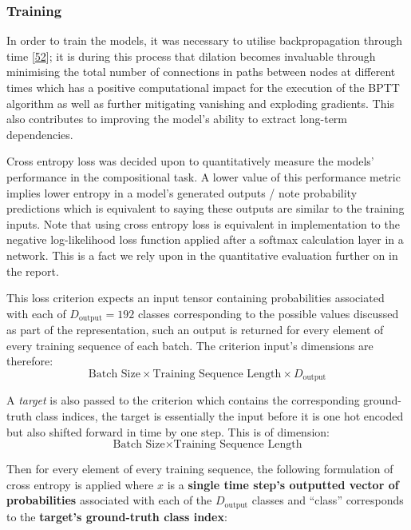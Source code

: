 \documentclass[12pt,]{article}
\begin{document}
\hypertarget{training}{%
\subsubsection{Training}\label{training}}

In order to train the models, it was necessary to utilise
backpropagation through time
{[}\protect\hyperlink{ref-werbos1990backpropagation}{52}{]}; it is
during this process that dilation becomes invaluable through minimising
the total number of connections in paths between nodes at different
times which has a positive computational impact for the execution of the
BPTT algorithm as well as further mitigating vanishing and exploding
gradients. This also contributes to improving the model's ability to
extract long-term dependencies.

Cross entropy loss was decided upon to quantitatively measure the
models' performance in the compositional task. A lower value of this
performance metric implies lower entropy in a model's generated outputs
/ note probability predictions which is equivalent to saying these
outputs are similar to the training inputs. Note that using cross
entropy loss is equivalent in implementation to the negative
log-likelihood loss function applied after a softmax calculation layer
in a network. This is a fact we rely upon in the quantitative evaluation
further on in the report.

This loss criterion expects an input tensor containing probabilities
associated with each of \(D_{\text{output}} = 192\) classes
corresponding to the possible values discussed as part of the
representation, such an output is returned for every element of every
training sequence of each batch. The criterion input's dimensions are
therefore:
\[\text{Batch Size} \times \text{Training Sequence Length} \times D_{\text{output}}\]

A \emph{target} is also passed to the criterion which contains the
corresponding ground-truth class indices, the target is essentially the
input before it is one hot encoded but also shifted forward in time by
one step. This is of dimension:
\[\text{Batch Size} \times \text{Training Sequence Length}\]

Then for every element of every training sequence, the following
formulation of cross entropy is applied where \(x\) is a \textbf{single
time step's outputted vector of probabilities} associated with each of
the \(D_{\text{output}}\) classes and ``class'' corresponds to the
\textbf{target's ground-truth class index}:
\end{document}
